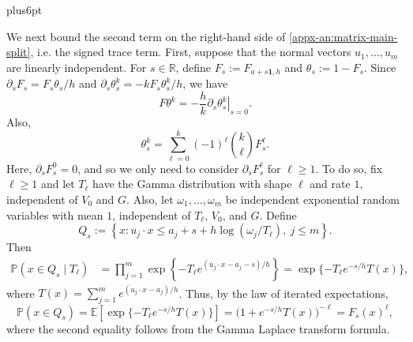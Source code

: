 \documentclass[11pt,letterpaper,twoside,leqno]{article}
\makeatletter
\theoremstyle{bookplain}
\theoremstyle{bookremark}
\renewenvironment{proof}[1][\proofname]{\par
  \pushQED{\qed}\normalfont\topsep6pt plus6pt\relax
  \trivlist\item[\hskip\labelsep\bfseries #1\@addpunct{.}]\ignorespaces
}{\popQED\endtrivlist\@endpefalse}
\newcommand{\E}{\mathbb E}
\newcommand{\Pp}{\mathbb P}
\newcommand{\R}{\mathbb R}
\makeatother
\begin{document}
\begin{proof}
We next bound the second term on the right-hand side of \eqref{appx-an:matrix-main-split}, i.e. the signed trace term.
First, suppose that the normal vectors $u_1,\dots, u_m$ are linearly independent. For
\(s\in\R\), {define} \(F_s:=F_{a+s\mathbf1,h}\) and
\(\theta_s:=1-F_s\).
Since
\( \partial_s F_s= F_s\theta_s/h\) and \(\partial_s\theta_s^k=-kF_s\theta_s^k/h\),
we have
\begin{equation}\label{eq: F theta k trick}
 F\theta^k=-\frac hk
 \left.\partial_s\theta_s^k\right|_{s=0}.
\end{equation}
Also,
\begin{equation}\label{eq: theta expansion}
 \theta_s^k
 =\sum_{\ell=0}^k(-1)^\ell\binom{k}{\ell}F_s^\ell.
\end{equation}
Here, $\partial_s F_s^0 = 0$, and so we only need to consider $\partial_s F_s^{\ell}$ for $\ell\geq 1$. To do so, fix $\ell\ge1$ and let $T_\ell$ have the Gamma
distribution with shape $\ell$ and rate \(1\), independent of $V_0$ and $G$. Also, let $\omega_1,\ldots,\omega_m$ be independent exponential random variables with mean \(1\), independent of $T_\ell$, $V_0$, and $G$.
Define
\[
 Q_s :=\left\{x:
 u_j\cdot x\le a_j+s+h\log(\omega_j/T_\ell),
 \ j\le m\right\}.
\]
Then
\[
 \begin{aligned}
 \Pp(x\in Q_s\mid T_\ell)
 &=\prod_{j=1}^m
 \exp\left\{-T_\ell
 e^{(u_j\cdot x-a_j-s)/h}\right\}
 =\exp\{-T_\ell e^{-s/h}T(x)\},
 \end{aligned}
\]
where $T(x) = \sum_{j=1}^m e^{(u_j\cdot x-a_j)/h}$. Thus, by the law of iterated expectations,
\begin{equation}
\Pp(x\in Q_s) = \E[\exp\{-T_\ell e^{-s/h}T(x)\}] = \bigl(1+e^{-s/h}T(x)\bigr)^{-\ell} = F_s(x)^\ell,
 \label{appx-an:gamma-mixture}
\end{equation}
where the second equality follows from the Gamma Laplace transform formula.


\end{proof}
\end{document}
